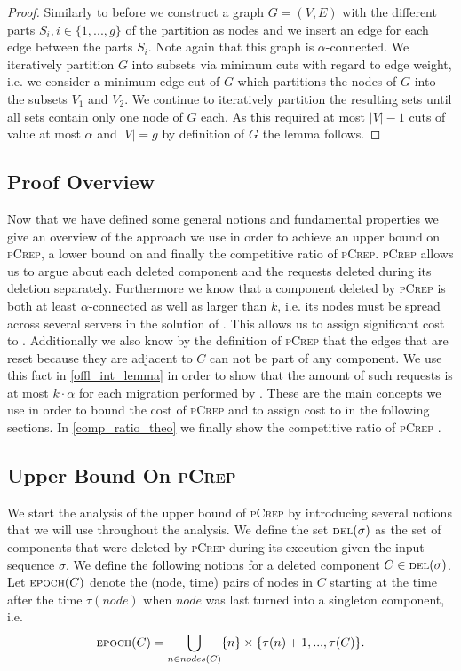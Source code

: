 \documentclass[a4paper,UKenglish,cleveref, autoref, thm-restate,authorcolumns]{lipics-v2019}
\newcommand{\adjDel}{\textsc{pCrep}}
\newcommand{\del}{\text{\scriptsize DEL}}
\newcommand{\opt}{\text{O{\scriptsize PT}}}
\newcommand{\epoch}{\text{\scriptsize EPOCH}}
\begin{document}
\begin{proof}
	Similarly to before we construct a graph $G=(V,E)$ with the different parts $S_i, i\in\{1,...,g\}$ of the partition as nodes and we insert an edge for each edge between the parts $S_i$. Note again that this graph is $\alpha$-connected. We iteratively partition $G$ into subsets via minimum cuts with regard to edge weight, i.e. we consider a minimum edge cut of $G$ which partitions the nodes of $G$ into the subsets $V_1$ and $V_2$. We continue to iteratively partition the resulting sets until all sets contain only one node of $G$ each. As this required at most $|V|-1$ cuts of value at most $\alpha$ and $|V|=g$ by definition of $G$ the lemma follows.
\end{proof}

\subsection{Proof Overview}

Now that we have defined some general notions and fundamental properties we give an overview of the approach we use in order to achieve an upper bound on \adjDel{}, a lower bound on \opt{} and finally the competitive ratio of \adjDel{}.
\adjDel{} allows us to argue about each deleted component and the requests deleted during its deletion separately.
Furthermore we know that a component deleted by \adjDel{} is both at least $\alpha$-connected as well as larger than $k$, i.e. its nodes must be spread across several servers in the solution of \opt{}. This allows us to assign significant cost to \opt{}.
Additionally we also know by the definition of \adjDel{} that the edges that are reset because they are adjacent to $C$ can not be part of any component. We use this fact in \cref{offl_int_lemma} in order to show that the amount of such requests is at most $k\cdot\alpha$ for each migration performed by \opt{}.
These are the main concepts we use in order to bound the cost of \adjDel{} and to assign cost to \opt{} in the following sections. In \cref{comp_ratio_theo} we finally show the competitive ratio of \adjDel{} .

\subsection{Upper Bound On \adjDel{}}

We start the analysis of the upper bound of \adjDel{} by introducing several notions that we will use throughout the analysis.
We define the set $\del(\sigma)$ as the set of components that were deleted by \adjDel{} during its execution given the input sequence $\sigma$.
We define the following notions for a deleted component $C\in\del{}(\sigma)$.
Let $\epoch{}(C)$ denote the (node, time) pairs of nodes in $C$ starting at the time after the time $\tau(node)$ when $node$ was last turned into a singleton component, i.e. 
\begin{align*}
\epoch{}(C)=\bigcup_{n\in nodes(C)}\{n\}\times\{\tau(n)+1,...,\tau(C)\}.
\end{align*}
\end{document}
